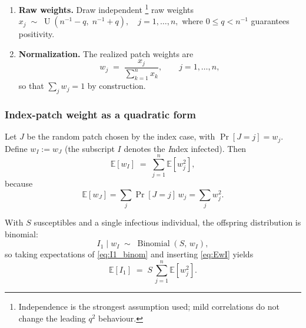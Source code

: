 \begin{enumerate}
\item \textbf{Raw weights.}  
  Draw independent%
  \footnote{Independence is the strongest assumption used;
            mild correlations do not change the leading
            $q^{2}$ behaviour.} raw weights
  $
    x_{j}\;\sim\; \operatorname{U}(n^{-1}-q,\;n^{-1}+q),
    \quad j=1,\dots,n,
  $
  where $0 \le q < n^{-1}$ guarantees positivity.

\item \textbf{Normalization.}  
  The realized patch weights are
  \begin{equation}
    w_{j}
      \;=\;
      \frac{x_{j}}
           {\displaystyle\sum_{k=1}^{n} x_{k}},
    \qquad j=1,\dots,n,
    \label{eq:w_normalise}
  \end{equation}
  so that $\sum_{j} w_{j}=1$ by construction.
\end{enumerate}

\subsubsection*{Index-patch weight as a quadratic form}

Let $J$ be the random patch chosen by the index case, with
$\Pr[J=j]=w_{j}$.  Define
$
  w_{I} := w_{J}
$
(the subscript $I$ denotes the \textit{I}ndex infected).  Then
\begin{equation}
  \mathbb{E}[w_{I}]
    \;=\;
    \sum_{j=1}^{n} \mathbb{E}[w_{j}^{2}],
    \label{eq:EwI}
\end{equation}
because 
\begin{equation}
\mathbb{E}[w_{J}]
      =\sum_{j} \Pr[J=j]\,w_{j}
      =\sum_{j} w_{j}^{2}.
\end{equation}

With $S$ susceptibles and a single infectious individual, the offspring
distribution is binomial:
\begin{equation}
  I_{1}\;\bigl|\;w_{I} \;\sim\;
    \operatorname{Binomial}(S,\,w_{I}),
  \label{eq:I1_binom}
\end{equation}
so taking expectations of \eqref{eq:I1_binom} and inserting
\eqref{eq:EwI} yields
\begin{equation}
  \mathbb{E}[I_{1}]
    \;=\; S \,\sum_{j=1}^{n} \mathbb{E}[w_{j}^{2}].
  \label{eq:EI1_sumwj2}
\end{equation}

